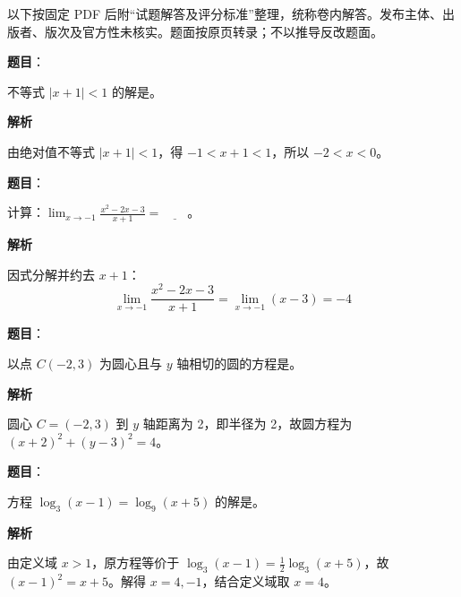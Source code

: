 

\begin{gktip}
以下按固定 PDF 后附“试题解答及评分标准”整理，统称卷内解答。发布主体、出版者、版次及官方性未核实。题面按原页转录；不以推导反改题面。
\end{gktip}

\begin{answer}

\textbf{题目}：

不等式 \(|x+1|<1\) 的解是\gkblank{}。

\textbf{解析}

由绝对值不等式 \(|x+1|<1\)，得 \(-1<x+1<1\)，所以 \(-2<x<0\)。


\end{answer}
\begin{answer}

\textbf{题目}：

计算：\(\displaystyle\lim_{x\to-1}\frac{x^2-2x-3}{x+1}=\underline{\qquad}\)。

\textbf{解析}

因式分解并约去 \(x+1\)：
\nopagebreak[4]
\[
\lim_{x\to-1}\frac{x^2-2x-3}{x+1}=\lim_{x\to-1}(x-3)=-4
\]


\end{answer}
\begin{answer}

\textbf{题目}：

以点 \(C(-2,3)\) 为圆心且与 \(y\) 轴相切的圆的方程是\gkblank{}。

\textbf{解析}

圆心 \(C=(-2,3)\) 到 \(y\) 轴距离为 2，即半径为 2，故圆方程为 \((x+2)^2+(y-3)^2=4\)。


\end{answer}
\begin{answer}

\textbf{题目}：

方程 \(\log_3(x-1)=\log_9(x+5)\) 的解是\gkblank{}。

\textbf{解析}

由定义域 \(x>1\)，原方程等价于 \(\log_3(x-1)=\frac12\log_3(x+5)\)，故 \((x-1)^2=x+5\)。解得 \(x=4,-1\)，结合定义域取 \(x=4\)。


\end{answer}
